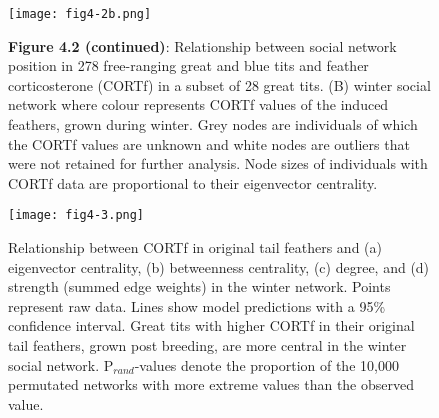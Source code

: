 \documentclass[10pt, twoside]{book} %
\begin{document}
\begin{figure}[h!]
	\begin{center}
		\texttt{[image: fig4-2b.png]}
	\end{center}
	\caption*{\textbf{Figure 4.2 (continued)}: Relationship between social network position in 278 free-ranging great and blue tits and feather corticosterone (CORTf) in a subset of 28 great tits. (B) winter social network where colour represents CORTf values of the induced feathers, grown during winter. Grey nodes are individuals of which the CORTf values are unknown and white nodes are outliers that were not retained for further analysis. Node sizes of individuals with CORTf data are proportional to their eigenvector centrality.}
\end{figure}

\begin{figure}[h!]
	\begin{center}
		\texttt{[image: fig4-3.png]}
	\end{center}
	\caption{Relationship between CORTf in original tail feathers and (a) eigenvector centrality, (b) betweenness centrality, (c) degree, and (d) strength (summed edge weights) in the winter network. Points represent raw data. Lines show model predictions with a 95\% confidence interval. Great tits with higher CORTf in their original tail feathers, grown post breeding, are more central in the winter social network. P$_{rand}$-values denote the proportion of the 10,000 permutated networks with more extreme values than the observed value.}\label{fig4-3}
\end{figure}
\end{document}
